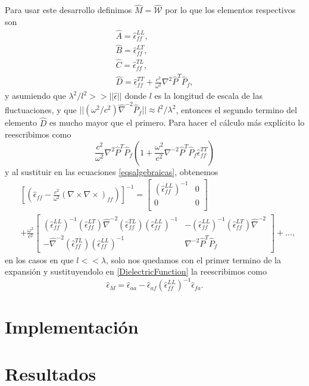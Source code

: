 \documentclass[12pt]{article}
\begin{document}
Para usar este desarrollo definimos $\hat{M} = \hat{\mathcal{W}}$ por
lo que los elementos respectivos son
\[
\begin{split}
  \hat{A} = \hat{\epsilon}_{ff}^{LL}, \\
  \hat{B} = \hat{\epsilon}_{ff}^{LT}, \\
  \hat{C} = \hat{\epsilon}_{ff}^{TL}, \\
  \hat{D} = \hat{\epsilon}_{ff}^{TT}+\frac{c^{2}}{\omega^{2}}\nabla ^{2}\hat{P}^{T}\hat{P}_{f},
\end{split}
\]
y asumiendo que $\lambda^{2}/l^{2} >> ||\hat{\epsilon}||$ donde $l$ es
la longitud de escala de las fluctuaciones, y que $||(\omega^{2}/c^{2})\hat{\nabla}^{-2}\hat{P}_{f}||\approx l^{2}/\lambda ^{2}$, entonces el segundo termino del
elemento $\hat{D}$ es mucho mayor que el primero. Para hacer el cálculo más explícito lo reescribimos como
\[ \frac{c^{2}}{\omega^{2}}\nabla ^{2}\hat{P}^{T}\hat{P}_{f}(1+\frac{\omega^{2}}{c^{2}}\nabla ^{-2}\hat{P}^{T}\hat{P}_{f}\hat{\epsilon}_{ff}^{TT}) \]
y al sustituir en las ecuaciones \eqref{eqsalgebraicas}, obtenemos
\begin{equation}
  \begin{split}
    &\left[(\hat{\epsilon}_{ff}- \frac{c^{2}}{\omega^{2}}(\nabla \times
      \nabla \times)_{ff})\right]^{-1}  =
    \left[ \begin{array}{cc}
        (\hat{\epsilon}_{ff}^{LL})^{-1} & 0 \\ 0 & 0 \\
    \end{array}
      \right] \\
   & + \frac{\omega^{2}}{c^{2}}\left[ \begin{array}{cc}
      (\hat{\epsilon}_{ff}^{LL})^{-1}(\hat{\epsilon}_{ff}^{LT})\hat{\nabla}^{-2}(\hat{\epsilon}_{ff}^{TL})(\hat{\epsilon}_{ff}^{LL})^{-1}  & -(\hat{\epsilon}_{ff}^{LL})^{-1}(\hat{\epsilon}_{ff}^{LT})\hat{\nabla}^{-2} \\ -\hat{\nabla}^{-2}(\hat{\epsilon}_{ff}^{TL})(\hat{\epsilon}_{ff}^{LL})^{-1}
      & \nabla^{-2}\hat{P}^{T}\hat{P}_{f}
      \end{array} \right] + ...,
    \end{split}
\end{equation}
en los casos en que $l << \lambda $, solo nos quedamos con el primer
termino de la expansión y sustituyendolo en \eqref{DielectricFunction} la reescribimos como
\begin{equation}
  \hat{\epsilon}_{M}=\hat{\epsilon}_{aa}-\hat{\epsilon}_{af}(\hat{\epsilon}_{ff}^{LL})^{-1}\hat{\epsilon}_{fa}.
\end{equation}



\section{Implementación}
\section{Resultados}

\begin{thebibliography}{0000}
  
  \end{thebibliography}
\end{document}
